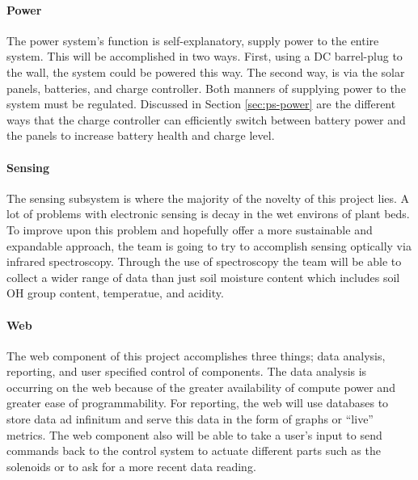 \paragraph{Power}
The power system's function is self-explanatory, supply power to the entire system. This will be accomplished in two ways. First, using a DC barrel-plug to the wall, the system could be powered this way. The second way, is via the solar panels, batteries, and charge controller. Both manners of supplying power to the system must be regulated. Discussed in Section \ref{sec:ps-power} are the different ways that the charge controller can efficiently switch between battery power and the panels to increase battery health and charge level.
\paragraph{Sensing}
The sensing subsystem is where the majority of the novelty of this project lies. A lot of problems with electronic sensing is decay in the wet environs of plant beds. To improve upon this problem and hopefully offer a more sustainable and expandable approach, the team is going to try to accomplish sensing optically via infrared spectroscopy. Through the use of spectroscopy the team will be able to collect a wider range of data than just soil moisture content which includes soil OH group content, temperatue, and acidity.
\paragraph{Web}
The web component of this project accomplishes three things; data analysis, reporting, and user specified control of components. The data analysis is occurring on the web because of the greater availability of compute power and greater ease of programmability. For reporting, the web will use databases to store data ad infinitum and serve this data in the form of graphs or ``live'' metrics. The web component also will be able to take a user's input to send commands back to the control system to actuate different parts such as the solenoids or to ask for a more recent data reading.
